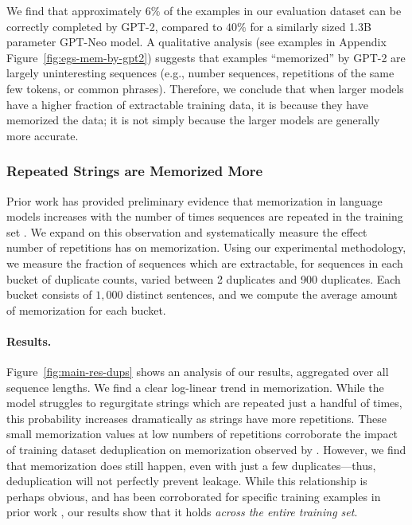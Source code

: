 We find that approximately $6\%$ of the examples in our evaluation dataset can be correctly 
completed by GPT-2, compared to $40\%$ for a similarly sized 1.3B parameter GPT-Neo model. 
A qualitative analysis (see examples in Appendix Figure~\ref{fig:egs-mem-by-gpt2}) suggests that examples ``memorized'' by GPT-2 are largely uninteresting
sequences (e.g., number sequences, repetitions of the same few tokens, or common phrases).
%
Therefore, we conclude that when larger models have a higher fraction of extractable training data,
it is because they have memorized the data; it is not simply because the larger models are generally more accurate.


\subsubsection{Repeated Strings are Memorized More}
\label{sec:duplicates}
Prior work has provided preliminary evidence that memorization in language models increases with the number of times sequences are repeated in the training set \citep{carlini2020extracting, 2021dedup}.
%
We expand on this observation and systematically measure the effect number of repetitions has on memorization.
%
Using our experimental methodology, we measure the fraction of sequences which are extractable, for sequences in each bucket of duplicate counts, varied between 2 duplicates and 900 duplicates.
Each bucket consists of $1{,}000$ distinct sentences, and we compute the average amount of memorization for each bucket.


\paragraph{Results.}
Figure~\ref{fig:main-res-dups} shows an analysis of our results, aggregated over all sequence lengths.
We find a clear log-linear trend in memorization. While the model struggles to regurgitate strings which are repeated just a handful of times, this probability increases dramatically as strings have more repetitions.
%
These small memorization values at low numbers of repetitions corroborate the impact of training dataset deduplication on memorization observed by \citet{2021dedup}.
%
However, we find that memorization does still happen, even with just a few duplicates---thus, deduplication will not perfectly prevent leakage.
%
While this relationship is perhaps obvious, and has been corroborated for specific training examples in prior work \citep{carlini2019secret, carlini2020extracting}, our results show that it holds \emph{across the entire training set}.



